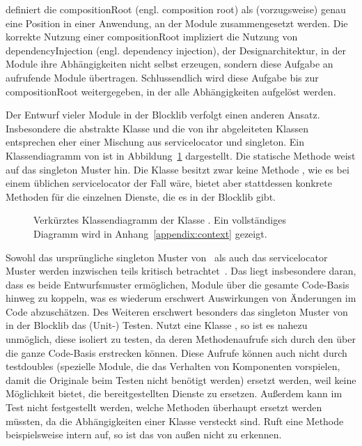 \textcite[S.~76]{Seemann2012} definiert die \gls{compositionRoot} (engl. composition root) als (vorzugsweise) genau eine Position in einer Anwendung, an der Module zusammengesetzt werden. Die korrekte Nutzung einer \gls{compositionRoot} impliziert die Nutzung von \gls{dependencyInjection} (engl. dependency injection), der Designarchitektur, in der Module ihre Abhängigkeiten nicht selbst erzeugen, sondern diese Aufgabe an aufrufende Module übertragen. Schlussendlich wird diese Aufgabe bis zur \gls{compositionRoot} weitergegeben, in der alle Abhängigkeiten aufgelöst werden. 


Der Entwurf vieler Module in der Blocklib verfolgt einen anderen Ansatz. Insbesondere die abstrakte Klasse \classContext{} und die von ihr abgeleiteten Klassen entsprechen eher einer Mischung aus \gls{servicelocator} und \gls{singleton}. Ein Klassendiagramm von \classContext{} ist in Abbildung~\ref{fig:diagContext} dargestellt. Die statische Methode  weist auf das \gls{singleton} Muster hin. Die Klasse besitzt zwar keine Methode , wie es bei einem üblichen \gls{servicelocator} der Fall wäre, bietet aber stattdessen konkrete Methoden für die einzelnen Dienste, die es in der Blocklib gibt.

\begin{figure}
  \begin{center}
    
  \end{center}
  \caption[Verkürztes Klassendiagramm der Klasse \classContext{}.]{Verkürztes Klassendiagramm der Klasse \classContext{}. Ein vollständiges Diagramm wird in Anhang~\vref{appendix:context} gezeigt.}\label{fig:diagContext}
\end{figure}

Sowohl das ursprüngliche \gls{singleton} Muster von~\textcite[S.~127~\psqq]{Gamma2016} als auch das \gls{servicelocator} Muster werden inzwischen teils kritisch betrachtet~\cites[S.~103~\psqq]{Nystrom2015}[S.~154~\psqq]{Seemann2012}. Das liegt insbesondere daran, dass es beide Entwurfsmuster ermöglichen, Module über die gesamte Code-Basis hinweg zu koppeln, was es wiederum erschwert Auswirkungen von Änderungen im Code abzuschätzen. Des Weiteren erschwert besonders das \gls{singleton} Muster von \classContext{} in der Blocklib das (Unit-) Testen. Nutzt eine Klasse \classContext{}, so ist es nahezu unmöglich, diese isoliert zu testen, da deren Methodenaufrufe sich durch den \classContext{} über die ganze Code-Basis erstrecken können. Diese  Aufrufe können auch nicht durch \glspl{testdouble} (spezielle Module, die das Verhalten von Komponenten vorspielen, damit die Originale beim Testen nicht benötigt werden) ersetzt werden, weil \classContext{} keine Möglichkeit bietet, die bereitgestellten Dienste zu ersetzen. Außerdem kann im Test nicht festgestellt werden, welche Methoden überhaupt ersetzt werden müssten, da die Abhängigkeiten einer Klasse versteckt sind. Ruft eine Methode beispielsweise intern  auf, so ist das von außen nicht zu erkennen.

